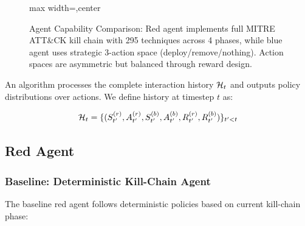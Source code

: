 \documentclass[12pt,oneside,a4paper]{article}
\newcounter{phase}[algorithm]
\theoremstyle{definition}
\theoremstyle{plain}
\begin{document}
\begin{figure}[H]
\begin{adjustbox}{max width=\linewidth,center}
\end{adjustbox}
\caption{Agent Capability Comparison: Red agent implements full MITRE ATT\&CK kill chain with 295 techniques across 4 phases, while blue agent uses strategic 3-action space (deploy/remove/nothing). Action spaces are asymmetric but balanced through reward design.}
\label{fig:agent_capabilities}
\end{figure}

An algorithm processes the complete interaction history $\mathcal{H}_t$ and outputs policy distributions over actions. We define history at timestep $t$ as:

\begin{equation}
\mathcal{H}_t = \{(S_{t'}^{(r)}, A_{t'}^{(r)}, S_{t'}^{(b)}, A_{t'}^{(b)}, R_{t'}^{(r)}, R_{t'}^{(b)})\}_{t' < t}
\end{equation}

\subsection{Red Agent}

\subsubsection{Baseline: Deterministic Kill-Chain Agent}
The baseline red agent follows deterministic policies based on current kill-chain phase:
\end{document}
